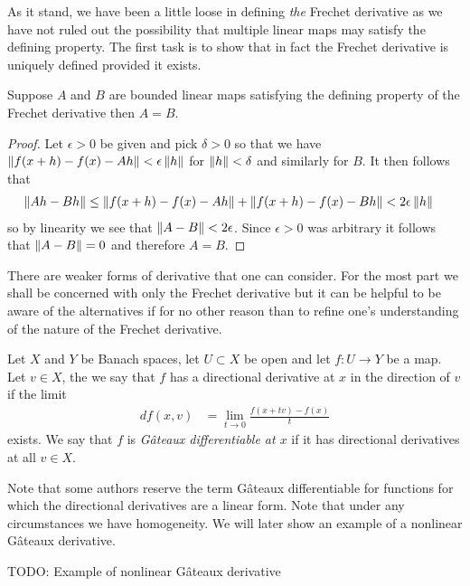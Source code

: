 As it stand, we have been a little loose in defining \emph{the}
Frechet derivative as we have not ruled out the possibility that
multiple linear maps may satisfy the defining property.   The first
task is to show that in fact the Frechet derivative is uniquely
defined provided it exists.

\begin{prop}Suppose $A$ and $B$ are bounded linear maps satisfying the
  defining property of the Frechet derivative then $A = B$.
\end{prop}
\begin{proof}
Let $\epsilon > 0$ be given and pick $\delta > 0$ so that we have
$\left \lVert f(x+h) - f(x) -Ah \right \rVert < \epsilon \left \lVert h \right \rVert$ for $\left \lVert h \right \rVert < \delta$
and similarly for $B$.  It then follows that
\begin{align*}
\left \lVert Ah - Bh \right \rVert &\leq \left \lVert f(x+h) - f(x) -Ah \right \rVert + \left \lVert f(x+h) - f(x)
                 -Bh \right \rVert < 2 \epsilon \left \lVert h \right \rVert
\end{align*}
so by linearity we see that $\left \lVert A - B \right \rVert < 2 \epsilon$.  Since
$\epsilon>0$ was arbitrary it follows that $\left \lVert A -B \right \rVert = 0$ and
therefore $A = B$.
\end{proof}

There are weaker forms of derivative that one can consider.  For the
most part we shall be concerned with only the Frechet derivative but
it can be helpful to be aware of the alternatives if for no other
reason than to refine one's understanding of the nature of the Frechet derivative.
\begin{defn}Let $X$ and $Y$ be Banach spaces, let $U \subset X$ be
  open and let $f : U \to Y$ be
  a map.  Let $v \in X$, the we say that $f$ has a directional
  derivative at $x$ in the direction of $v$ if the limit 
\begin{align*}
df(x,v) &= \lim_{t \to
    0} \frac{f(x + tv) - f(x)}{t}
\end{align*} 
exists.  We say that $f$ is
  \emph{G\^{a}teaux differentiable at $x$} if it has directional
  derivatives at all $v \in X$.
\end{defn}

Note that some authors reserve the term G\^{a}teaux differentiable for
functions for which the directional derivatives are a linear form.
Note that under any circumstances we have homogeneity.  We will later show an example of
a nonlinear G\^{a}teaux derivative.

TODO: Example of nonlinear G\^{a}teaux derivative

